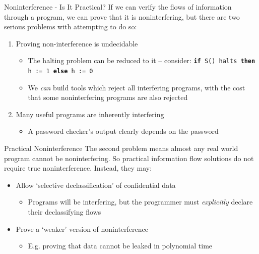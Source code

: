 \begin{frame}{Noninterference - Is It Practical?}
	If we can verify the flows of information through a program, we can prove that it is noninterfering, but there are two serious problems with attempting to do so:
	
	\begin{enumerate}
		\item Proving non-interference is undecidable
			\begin{itemize}
				\item The halting problem can be reduced to it -- consider: \newline \texttt{\textbf{if} S() halts \textbf{then} h := 1 \textbf{else} h := 0} \cite{ifbackground:denninghalting}
				\item We \textit{can} build tools which reject all interfering programs, with the cost that some noninterfering programs are also rejected 
			\end{itemize}
		\item Many useful programs are inherently interfering
			\begin{itemize}
				\item A password checker's output clearly depends on the password
			\end{itemize}
	\end{enumerate}
\end{frame}

\begin{frame}{Practical Noninterference}
	The second problem means almost any real world program cannot be noninterfering. So practical information flow solutions do not require true noninterference. Instead, they may:
	
	\begin{itemize}
		\item Allow `selective declassification' of confidential data
		\begin{itemize}
			\item Programs will be interfering, but the programmer must \textit{explicitly} declare their declassifying flows
		\end{itemize}
		\item Prove a `weaker' version of noninterference
		\begin{itemize}
			\item E.g. proving that data cannot be leaked in polynomial time
		\end{itemize}
	\end{itemize}
\end{frame}

